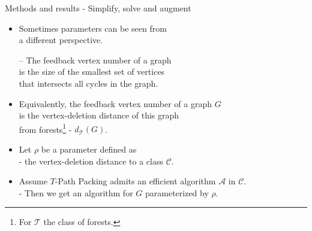 \documentclass{beamer}
\begin{document}
\begin{frame}[t]{Methods and results - Simplify, solve and augment}
	\begin{itemize}[<+->]
		\item Sometimes parameters can be seen from\\
			\hspace{.5cm} a different perspective.
		\item[--] The feedback vertex number of a graph\\
			\hspace{.5cm} is the size of the smallest set of vertices\\
			\hspace{.5cm} that intersects all cycles in the graph.
		\item Equivalently, the feedback vertex number of a graph $G$\\
			\hspace{.5cm} is the vertex-deletion distance of this graph\\
			\hspace{.5cm} from forests\footnote{For $\mathcal{T}$ the class of forests.} - $d_{\mathcal{T}}(G)$.
		\item Let $\rho$ be a parameter defined as \\ \hspace{.5cm} - the vertex-deletion distance to a class $\mathcal{C}$.
		\item Assume $T$-Path Packing admits an efficient algorithm $\mathcal{A}$ in $\mathcal{C}$.\\ \hspace{.5cm} - Then we get an algorithm for $G$ parameterized by $\rho$.
	\end{itemize}
\end{frame}
\end{document}
